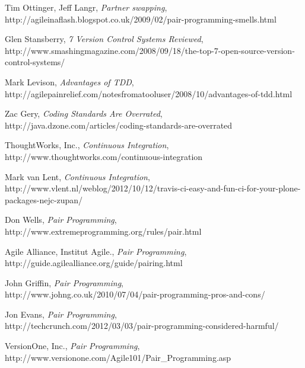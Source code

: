 \documentclass[10pt, a4paper]{article}
\begin{document}
\begin{thebibliography}{9}

  Tim Ottinger, Jeff Langr,
  \emph{Partner swapping},
  \\http://agileinaflash.blogspot.co.uk/2009/02/pair-programming-smells.html

  Glen Stansberry,
  \emph{7 Version Control Systems Reviewed},
  \\http://www.smashingmagazine.com/2008/09/18/the-top-7-open-source-version-control-systems/
  
  Mark Levison,
  \emph{Advantages of TDD},
  \\http://agilepainrelief.com/notesfromatooluser/2008/10/advantages-of-tdd.html
  
  Zac Gery,
  \emph{Coding Standards Are Overrated},
  \\http://java.dzone.com/articles/coding-standards-are-overrated

  ThoughtWorks, Inc.,
  \emph{Continuous Integration},
  \\http://www.thoughtworks.com/continuous-integration

  Mark van Lent,
  \emph{Continuous Integration},
  \\http://www.vlent.nl/weblog/2012/10/12/travis-ci-easy-and-fun-ci-for-your-plone-packages-nejc-zupan/ 

  Don Wells,
  \emph{Pair Programming},
  \\http://www.extremeprogramming.org/rules/pair.html
  
  Agile Alliance, Institut Agile.,
  \emph{Pair Programming},
  \\http://guide.agilealliance.org/guide/pairing.html
  
  John Griffin,
  \emph{Pair Programming},
  \\http://www.johng.co.uk/2010/07/04/pair-programming-pros-and-cons/

  Jon Evans,
  \emph{Pair Programming},
  \\http://techcrunch.com/2012/03/03/pair-programming-considered-harmful/ 

  VersionOne, Inc.,
  \emph{Pair Programming},
  \\http://www.versionone.com/Agile101/Pair{\_}Programming.asp

\end{thebibliography}
\end{document}
